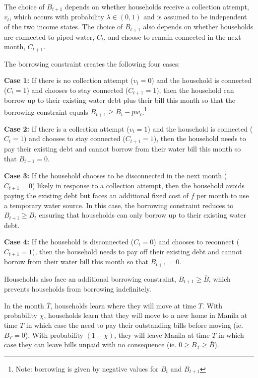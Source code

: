 \documentclass[12pt]{article}
\begin{document}
The choice of $B_{t+1}$ depends on whether households receive a collection attempt, $v_t$, which occurs with probability $\lambda \in (0,1)$ and is assumed to be independent of the two income states.  The choice of $B_{t+1}$ also depends on whether households are connected to piped water, $C_t$, and choose to remain connected in the next month, $C_{t+1}$.  


The borrowing constraint creates the following four cases:

\textbf{Case 1:} If there is no collection attempt ($v_t=0$) and the household is connected ($C_{t}=1$) and chooses to stay connected ($C_{t+1}=1$), then the household can borrow up to their existing water debt plus their bill this month so that the borrowing constraint equals $B_{t+1}\geq B_t -  p w_t $.\footnote{Note: borrowing is given by negative values for $B_t$ and $B_{t+1}$}

\textbf{Case 2:} If there is a collection attempt ($v_t=1$) and the household is connected ($C_t=1$) and chooses to stay connected ($C_{t+1}=1$), then the household needs to pay their existing debt and cannot borrow from their water bill this month so that $B_{t+1} = 0$.

\textbf{Case 3:} If the household chooses to be disconnected in the next month ($C_{t+1}=0$) likely in response to a collection attempt, then the household avoids paying the existing debt but faces an additional fixed cost of $f$ per month to use a temporary water source.  In this case, the borrowing constraint reduces to $ B_{t+1} \geq B_t$ ensuring that households can only borrow up to their existing water debt.  

\textbf{Case 4:} If the household is disconnected ($C_t=0$) and chooses to reconnect ($C_{t+1}=1$), then the household needs to pay off their existing debt and cannot borrow from their water bill this month so that $B_{t+1} = 0$.  

Households also face an additional borrowing constraint, $ B_{t+1} \geq \overline{B}$, which prevents households from borrowing indefinitely.  

In the month $\overline{T}$, households learn where they will move at time $T$. With probability $\chi$, households learn that they will move to a new home in Manila at time $T$ in which case the need to pay their outstanding bills before moving (ie. $B_T=0$).  With probability $(1-\chi)$, they will leave Manila at time $T$ in which case they can leave bills unpaid with no consequence (ie. $0\geq B_T \geq \overline{B}$).
\end{document}
